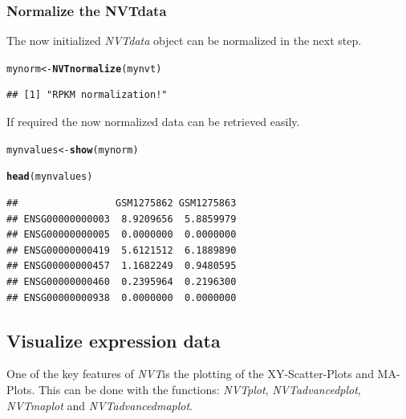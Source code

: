 \documentclass[11pt]{article}\usepackage[]{graphicx}\usepackage[usenames,dvipsnames]{color}
\makeatletter
\newcommand{\hlstd}[1]{\textcolor[rgb]{0.345,0.345,0.345}{#1}}%
\newcommand{\hlkwb}[1]{\textcolor[rgb]{0.69,0.353,0.396}{#1}}%
\newcommand{\hlkwd}[1]{\textcolor[rgb]{0.737,0.353,0.396}{\textbf{#1}}}%
\newenvironment{kframe}{%
 \def\at@end@of@kframe{}%
 \ifinner\ifhmode%
  \def\at@end@of@kframe{\end{minipage}}%
  \begin{minipage}{\columnwidth}%
 \fi\fi%
 \def\FrameCommand##1{\hskip\@totalleftmargin \hskip-\fboxsep
 \colorbox{shadecolor}{##1}\hskip-\fboxsep
     \hskip-\linewidth \hskip-\@totalleftmargin \hskip\columnwidth}%
 \MakeFramed {\advance\hsize-\width
   \@totalleftmargin\z@ \linewidth\hsize
   \@setminipage}}%
 {\par\unskip\endMakeFramed%
 \at@end@of@kframe}
\newenvironment{knitrout}{}{} %
\newcommand{\nvt}{\textit{NVT}}
\makeatother
\begin{document}
\subsubsection{Normalize the NVTdata }

The now initialized \textit{NVTdata} object can be normalized in the next step.

\begin{knitrout}
\color{fgcolor}\begin{kframe}
\begin{alltt}
\hlstd{mynorm} \hlkwb{<-} \hlkwd{NVTnormalize}\hlstd{(mynvt)}
\end{alltt}
\begin{verbatim}
## [1] "RPKM normalization!"
\end{verbatim}
\end{kframe}
\end{knitrout}

If required the now normalized data can be retrieved easily.

\begin{knitrout}
\color{fgcolor}\begin{kframe}
\begin{alltt}
\hlstd{mynvalues} \hlkwb{<-} \hlkwd{show}\hlstd{(mynorm)}

\hlkwd{head}\hlstd{(mynvalues)}
\end{alltt}
\begin{verbatim}
##                 GSM1275862 GSM1275863
## ENSG00000000003  8.9209656  5.8859979
## ENSG00000000005  0.0000000  0.0000000
## ENSG00000000419  5.6121512  6.1889890
## ENSG00000000457  1.1682249  0.9480595
## ENSG00000000460  0.2395964  0.2196300
## ENSG00000000938  0.0000000  0.0000000
\end{verbatim}
\end{kframe}
\end{knitrout}

\subsection{Visualize expression data}

One of the key features of \nvt is the plotting of the XY-Scatter-Plots and MA-Plots. This can be done with the functions:
\textit{NVTplot}, \textit{NVTadvancedplot}, \textit{NVTmaplot} and \textit{NVTadvancedmaplot}.

\newpage
\end{document}

